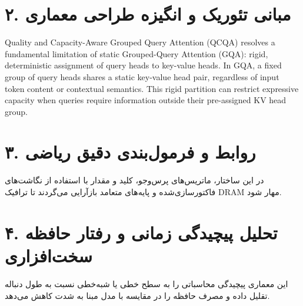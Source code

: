 \documentclass[12pt,a4paper]{article}
\begin{document}
\section*{۲. مبانی تئوریک و انگیزه طراحی معماری}
Quality and Capacity-Aware Grouped Query Attention (QCQA) resolves a fundamental limitation of static Grouped-Query Attention (GQA): rigid, deterministic assignment of query heads to key-value heads. In GQA, a fixed group of query heads shares a static key-value head pair, regardless of input token content or contextual semantics. This rigid partition can restrict expressive capacity when queries require information outside their pre-assigned KV head group.

\section*{۳. روابط و فرمول‌بندی دقیق ریاضی}
در این ساختار، ماتریس‌های پرس‌وجو، کلید و مقدار با استفاده از نگاشت‌های فاکتورسازی‌شده و پایه‌های متعامد بازآرایی می‌گردند تا ترافیک DRAM مهار شود.

\section*{۴. تحلیل پیچیدگی زمانی و رفتار حافظه سخت‌افزاری}
این معماری پیچیدگی محاسباتی را به سطح خطی یا شبه‌خطی نسبت به طول دنباله تقلیل داده و مصرف حافظه را در مقایسه با مدل مبنا به شدت کاهش می‌دهد.
\end{document}
